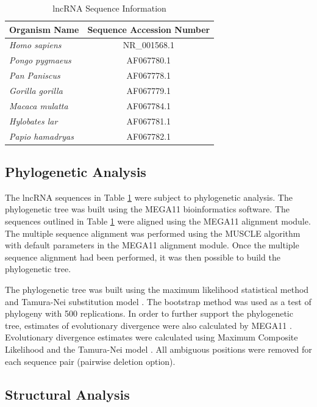 \documentclass[conference, 11pt]{IEEEtran}
\begin{document}
\begin{table}[ht]
  \centering
  \caption{lncRNA Sequence Information}
  \label{tbl:accession}
  \begin{tabular}{lc}
    \toprule
    Organism Name & Sequence Accession Number \\
    \midrule
    \emph{Homo sapiens}    & NR\_001568.1 \\
    \emph{Pongo pygmaeus}  & AF067780.1 \\
    \emph{Pan Paniscus}    & AF067778.1 \\
    \emph{Gorilla gorilla} & AF067779.1 \\
    \emph{Macaca mulatta}  & AF067784.1 \\
    \emph{Hylobates lar}   & AF067781.1 \\
    \emph{Papio hamadryas} & AF067782.1 \\
    \bottomrule
  \end{tabular}
\end{table}

\subsection{Phylogenetic Analysis}\label{sec:phylo}

The lncRNA sequences in Table \ref{tbl:accession} were subject to phylogenetic analysis.
The phylogenetic tree was built using the MEGA11 \cite{tamura2021mega11} bioinformatics software. 
The sequences outlined in Table \ref{tbl:accession} were aligned using the MEGA11 alignment module. 
The multiple sequence alignment was performed using the MUSCLE algorithm \cite{edgar2004muscle} with default parameters in the MEGA11 alignment module. 
Once the multiple sequence alignment had been performed, it was then possible to build the phylogenetic tree. 

The phylogenetic tree was built using the maximum likelihood statistical method and Tamura-Nei substitution model \cite{tamura1993estimation, tamura2004prospects}. 
The bootstrap method was used as a test of phylogeny with 500 replications.
In order to further support the phylogenetic tree, estimates of evolutionary divergence were also calculated by MEGA11 \cite{tamura2021mega11}. 
Evolutionary divergence estimates were calculated using Maximum Composite Likelihood and the Tamura-Nei model \cite{tamura1993estimation, tamura2004prospects}. 
All ambiguous positions were removed for each sequence pair (pairwise deletion option). 

\subsection{Structural Analysis}\label{sec:structure}
\end{document}
